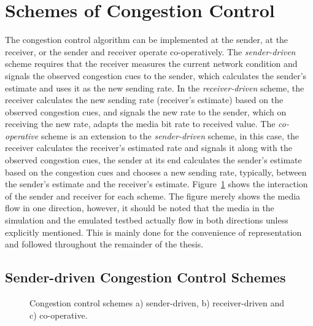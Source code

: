 \section{Schemes of Congestion Control}

The congestion control algorithm can be implemented at the sender, at the
receiver, or the sender and receiver operate co-operatively. The
\emph{sender-driven} scheme requires that the receiver measures the current
network condition and signals the observed congestion cues to the sender, which
calculates the sender's estimate and uses it as the new sending rate. In the
\emph{receiver-driven} scheme, the receiver calculates the new sending rate
(receiver's estimate) based on the observed congestion cues, and signals the
new rate to the sender, which on receiving the new rate, adapts the media bit
rate to received value. The \emph{co-operative} scheme is an extension to the
\emph{sender-driven} scheme, in this case, the receiver calculates the
receiver's estimated rate and signals it along with the observed congestion
cues, the sender at its end calculates the sender's estimate based on the
congestion cues and chooses a new sending rate, typically, between the
sender's estimate and the receiver's estimate. Figure~\ref{fig:cc:scheme}
shows the interaction of the sender and receiver for each scheme. The figure
merely shows the media flow in one direction, however, it should be noted that
the media in the simulation and the emulated testbed actually flow in both
directions unless explicitly mentioned. This is mainly done for the
convenience of representation and followed throughout the remainder of the
thesis.

\subsection{Sender-driven Congestion Control Schemes}

\begin{figure}[!t]
  \centerline{
  }
  \centerline{
  }
  \centerline{
  }
  \caption{Congestion control schemes a) sender-driven, b) receiver-driven
and c) co-operative.}
  \label{fig:cc:scheme}
\end{figure}

